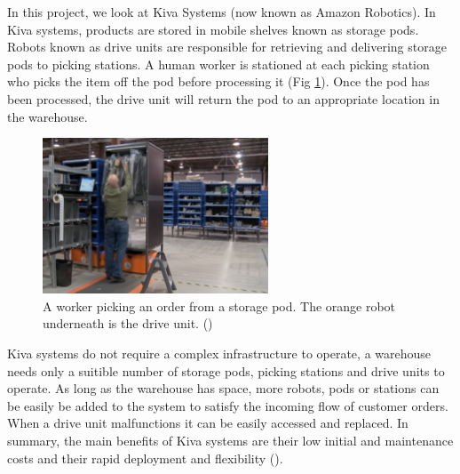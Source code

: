 \documentclass[a4paper,11pt]{article}
\begin{document}
In this project, we look at Kiva Systems (now known as Amazon Robotics). In Kiva systems, products are stored in mobile shelves known as storage pods. Robots known as drive units are responsible for retrieving and delivering storage pods to picking stations. A human worker is stationed at each picking station who picks the item off the pod before processing it (Fig \ref{kivaprocess}). Once the pod has been processed, the drive unit will return the pod to an appropriate location in the warehouse.

\begin{figure}[h!]
	\centering
	\includegraphics[width=0.6\textwidth ]{graphics/kivaprocess}
	\caption{A worker picking an order from a storage pod. The orange robot underneath is the drive unit. (\cite{kivayoutube2010quietlogistics})}
	\label{kivaprocess}
\end{figure}


Kiva systems do not require a complex infrastructure to operate, a warehouse needs only a suitible number of storage pods, picking stations and drive units to operate. As long as the warehouse has space, more robots, pods or stations can be easily be added to the system to satisfy the incoming flow of customer orders. When a drive unit malfunctions it can be easily accessed and replaced. In summary, the main benefits of Kiva systems are their low initial and maintenance costs and their rapid deployment and flexibility (\cite{wurman2008coordinating}).
\end{document}
